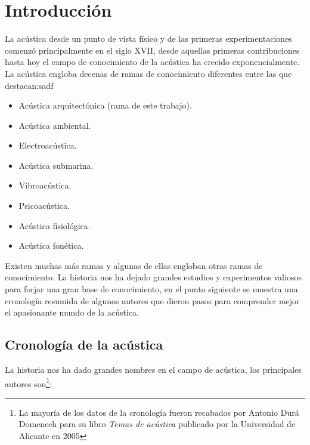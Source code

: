 
\chapter{Introducción}


La acústica desde un punto de vista físico y de las primeras experimentaciones comenzó principalmente en el siglo XVII, desde aquellas primeras contribuciones hasta hoy el campo de conocimiento de la acústica ha crecido exponencialmente. La acústica engloba decenas de ramas de conocimiento diferentes entre las que destacan:sadf

\begin{itemize}
  \item Acústica arquitectónica (rama de este trabajo).
  \item Acústica ambiental.
  \item Electroacústica.
  \item Acústica submarina.
  \item Vibroacústica.
  \item Psicoacústica.
  \item Acústica fisiológica.
  \item Acústica fonética.
\end{itemize}

Existen muchas más ramas y algunas de ellas engloban otras ramas de conocimiento. La historia nos ha dejado grandes estudios y experimentos valiosos para forjar una gran base de conocimiento, en el punto siguiente se muestra una cronología resumida de algunos autores que dieron pasos para comprender mejor el apasionante mundo de la acústica.

\section{Cronología de la acústica}

La historia nos ha dado grandes nombres en el campo de acústica, los principales autores son\footnote{La mayoría de los datos de la cronología fueron recabados por Antonio Durá Domenech para su libro \textit{Temas de acústica} publicado por la Universidad de Alicante en 2005}:

